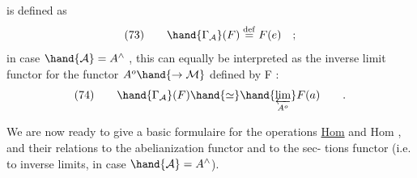 
is defined as
\[ (73) \qquad \hand{\Gamma_{\mathcal{A}}}(F) \overset{\mathrm{def}}{=} F(e) \quad ; \]
in case $\hand{\mathcal{A}} = A^{\wedge}$ , this can equally be interpreted as the inverse limit
functor for the functor $A^{o}\hand{\rightarrow \mathcal{M}}$ defined by F :
\[ (74) \qquad \hand{\Gamma_{\mathcal{A}}}(F) \hand{\simeq} \hand{\varprojlim_{A^{o}}} F(a) \qquad . \]

We are now ready to give a basic formulaire for the operations \uline{Hom} and
Hom , and their relations to the abelianization functor and to the sec-%
tions functor (i.e. to inverse limits, in case $\hand{\mathcal{A}} = A^{\wedge}$).

